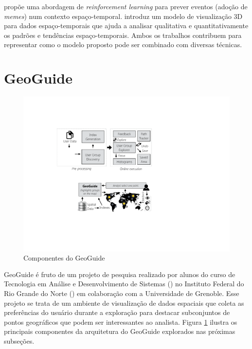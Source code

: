 propõe uma abordagem de {\em reinforcement learning} para prever eventos (adoção de {\em memes}) num contexto espaço-temporal.  introduz um modelo de visualização 3D para dados espaço-temporais que ajuda a analisar qualitativa e quantitativamente os padrões e tendências espaço-temporais. Ambos os trabalhos contribuem para representar como o modelo proposto pode ser combinado com diversas técnicas.

\section{GeoGuide}

\begin{figure}[t]
	\caption{Componentes do GeoGuide}
	\label{fig:framework}
	\centering
	\includegraphics[width=\columnwidth]{imagens/framework}
	\vspace{-10pt}
\end{figure}

GeoGuide \cite{omidvarTehrani2017} é fruto de um projeto de pesquisa realizado por alunos do curso de Tecnologia em Análise e Desenvolvimento de Sistemas () no Instituto Federal do Rio Grande do Norte () em colaboração com a Universidade de Grenoble. Esse projeto se trata de um ambiente de visualização de dados espaciais que coleta as preferências do usuário durante a exploração para destacar subconjuntos de pontos geográficos que podem ser interessantes ao analista. Figura \ref{fig:framework} ilustra os principais componentes da arquitetura do GeoGuide explorados nas próximas subseções.

